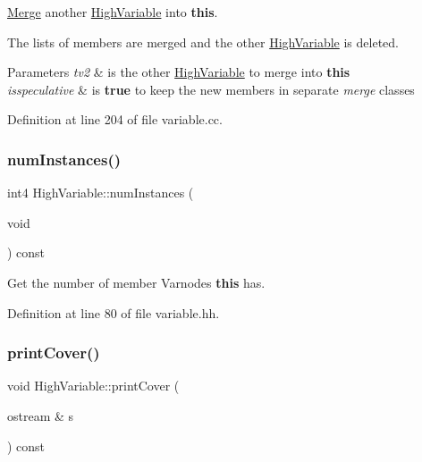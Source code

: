 \mbox{\hyperlink{class_merge}{Merge}} another \mbox{\hyperlink{class_high_variable}{High\+Variable}} into {\bfseries{this}}. 

The lists of members are merged and the other \mbox{\hyperlink{class_high_variable}{High\+Variable}} is deleted. 
\begin{DoxyParams}{Parameters}
{\em tv2} & is the other \mbox{\hyperlink{class_high_variable}{High\+Variable}} to merge into {\bfseries{this}} \\
\hline
{\em isspeculative} & is {\bfseries{true}} to keep the new members in separate {\itshape merge} classes \\
\hline
\end{DoxyParams}


Definition at line 204 of file variable.\+cc.

\mbox{\label{class_high_variable_a111ec7b8c313b6b89e7fb45f9025e524}} 
\subsubsection{\texorpdfstring{numInstances()}{numInstances()}}
{\footnotesize\ttfamily int4 High\+Variable\+::num\+Instances (\begin{DoxyParamCaption}\item[{void}]{ }\end{DoxyParamCaption}) const\hspace{0.3cm}{\ttfamily [inline]}}



Get the number of member Varnodes {\bfseries{this}} has. 



Definition at line 80 of file variable.\+hh.

\mbox{\label{class_high_variable_ad550ad1465e95cb3b114ee9d6f4d5630}} 
\subsubsection{\texorpdfstring{printCover()}{printCover()}}
{\footnotesize\ttfamily void High\+Variable\+::print\+Cover (\begin{DoxyParamCaption}\item[{ostream \&}]{s }\end{DoxyParamCaption}) const\hspace{0.3cm}{\ttfamily [inline]}}



